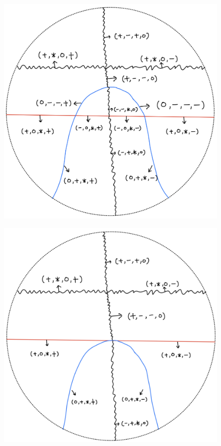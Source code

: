 \begin{definition}
\begin{enumerate}
\begin{itemize}
\begin{figure}[H]
    \caption{}
    \label{fig:your-label}
\end{figure}
\begin{figure}[H]
    \centering
    \includegraphics[scale = 0.45]{diagrams/cobord'2/14.png} 
    \caption{}
    \label{fig:your-label}
\end{figure}
\begin{figure}[H]
    \centering
    \includegraphics[scale = 0.45]{diagrams/cobord'2/15.png} 

\end{figure}
\end{itemize}
\end{enumerate}
\end{definition}
